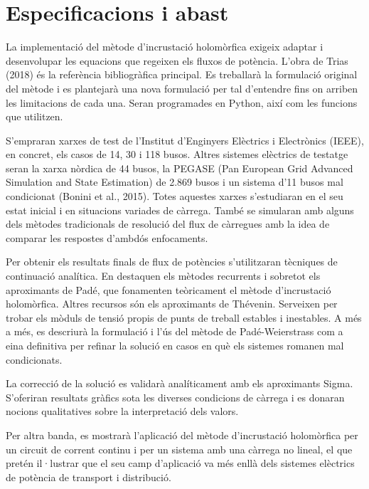 \section{Especificacions i abast}
La implementació del mètode d'incrustació holomòrfica exigeix adaptar i desenvolupar les equacions que regeixen els fluxos de potència. L'obra de Trias (2018) és la referència bibliogràfica principal. Es treballarà la formulació original del mètode i es plantejarà una nova formulació per tal d'entendre fins on arriben les limitacions de cada una. Seran programades en Python, així com les funcions que utilitzen.

S'empraran xarxes de test de l'Institut d'Enginyers Elèctrics i Electrònics (IEEE), en concret, els casos de 14, 30 i 118 busos. Altres sistemes elèctrics de testatge seran la xarxa nòrdica de 44 busos, la PEGASE (Pan European Grid Advanced Simulation and State Estimation) de 2.869 busos i un sistema d'11 busos mal condicionat (Bonini et al., 2015). Totes aquestes xarxes s'estudiaran en el seu estat inicial i en situacions variades de càrrega. També se simularan amb alguns dels mètodes tradicionals de resolució del flux de càrregues amb la idea de comparar les respostes d'ambdós enfocaments.

Per obtenir els resultats finals de flux de potències s'utilitzaran tècniques de continuació analítica. En destaquen els mètodes recurrents i sobretot els aproximants de Padé, que fonamenten teòricament el mètode d'incrustació holomòrfica. Altres recursos són els aproximants de Thévenin. Serveixen per trobar els mòduls de tensió propis de punts de treball estables i inestables. A més a més, es descriurà la formulació i l'ús del mètode de Padé-Weierstrass com a eina definitiva per refinar la solució en casos en què els sistemes romanen mal condicionats.
 
La correcció de la solució es validarà analíticament amb els aproximants Sigma. S'oferiran resultats gràfics sota les diverses condicions de càrrega i es donaran nocions qualitatives sobre la interpretació dels valors.

Per altra banda, es mostrarà l'aplicació del mètode d'incrustació holomòrfica per un circuit de corrent continu i per un sistema amb una càrrega no lineal, el que pretén il·lustrar que el seu camp d'aplicació va més enllà dels sistemes elèctrics de potència de transport i distribució.